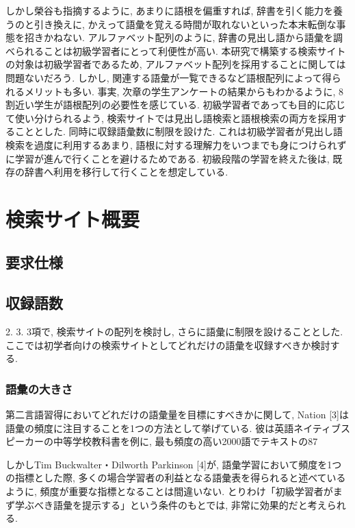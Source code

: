\documentclass[technicalreport]{ieicej}
\begin{document}
しかし榮谷\cite{sakaedani2008}も指摘するように, あまりに語根を偏重すれば, 辞書を引く能力を養うのと引き換えに, かえって語彙を覚える時間が取れないといった本末転倒な事態を招きかねない. アルファベット配列のように, 辞書の見出し語から語彙を調べられることは初級学習者にとって利便性が高い. 本研究で構築する検索サイトの対象は初級学習者であるため, アルファベット配列を採用することに関しては問題ないだろう. しかし, 関連する語彙が一覧できるなど語根配列によって得られるメリットも多い. 事実, 次章の学生アンケートの結果からもわかるように, 8割近い学生が語根配列の必要性を感じている. 初級学習者であっても目的に応じて使い分けられるよう, 検索サイトでは見出し語検索と語根検索の両方を採用することとした. 同時に収録語彙数に制限を設けた. これは初級学習者が見出し語検索を過度に利用するあまり, 語根に対する理解力をいつまでも身につけられずに学習が進んで行くことを避けるためである. 初級段階の学習を終えた後は, 既存の辞書へ利用を移行して行くことを想定している. 

\section{検索サイト概要}
\subsection{要求仕様}
\subsection{収録語数}
2. 3. 3項で, 検索サイトの配列を検討し, さらに語彙に制限を設けることとした. ここでは初学者向けの検索サイトとしてどれだけの語彙を収録すべきか検討する.

\subsubsection{語彙の大きさ}
第二言語習得においてどれだけの語彙量を目標にすべきかに関して, Nation [3]は語彙の頻度に注目することを1つの方法として挙げている. 彼は英語ネイティブスピーカーの中等学校教科書を例に, 最も頻度の高い2000語でテキストの87%

しかしTim Buckwalter・Dilworth Parkinson [4]が, 語彙学習において頻度を1つの指標とした際, 多くの場合学習者の利益となる語彙表を得られると述べているように, 頻度が重要な指標となることは間違いない. とりわけ「初級学習者がまず学ぶべき語彙を提示する」という条件のもとでは, 非常に効果的だと考えられる.
\end{document}
